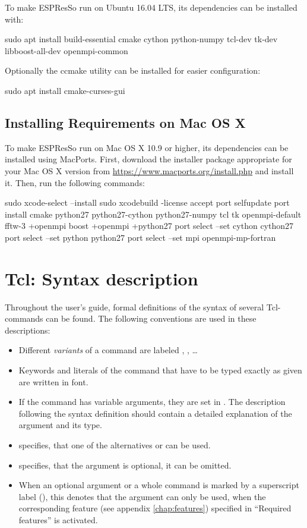 To make ESPResSo run on Ubuntu 16.04 LTS, its dependencies can be installed with:
\begin{code}
  sudo apt install build-essential cmake cython python-numpy tcl-dev tk-dev libboost-all-dev openmpi-common
\end{code}
Optionally the ccmake utility can be installed for easier configuration:
\begin{code}
  sudo apt install cmake-curses-gui
\end{code}

\subsection{Installing Requirements on Mac OS X}
\label{sec:installing-requirements-mac}

To make ESPResSo run on Mac OS X 10.9 or higher, its dependencies can be installed using MacPorts.
First, download the installer package appropriate for your Mac OS X version from \url{https://www.macports.org/install.php} and install it. Then, run the following commands:
\begin{code}
  sudo xcode-select --install
  sudo xcodebuild -license accept
  port selfupdate
  port install cmake python27 python27-cython python27-numpy tcl tk openmpi-default fftw-3 +openmpi boost +openmpi +python27
  port select --set cython cython27
  port select --set python python27
  port select --set mpi openmpi-mp-fortran
\end{code}

\section{Tcl: Syntax description}
\label{sec:syntax}


Throughout the user's guide, formal definitions of the syntax of
several Tcl-commands can be found. The following conventions are used
in these descriptions:
\begin{itemize}
\item Different \emph{variants} of a command are labeled ,
  , \ldots
\item Keywords and literals of the command that have to be typed
  exactly as given are written in  font.
\item If the command has variable arguments, they are set in
  . The description following the syntax definition
  should contain a detailed explanation of the argument and its
  type.
\item \texttt{} specifies, that one
  of the alternatives  or  can be used.
\item \texttt{} specifies, that the argument
   is optional, \ie it can be omitted.
\item When an optional argument or a whole command is marked by a
  superscript label (), this denotes that the argument can
  only be used, when the corresponding feature (see appendix
  \vref{chap:features}) specified in ``Required features'' is
  activated.
\end{itemize}


